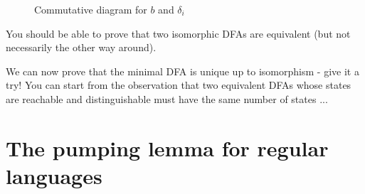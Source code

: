 \begin{figure}[h]
\caption{Commutative diagram for $b$ and $\delta_i$\label{diagram1}}
\end{figure}


You should be able to prove that two isomorphic DFAs are equivalent
(but not necessarily the other way around).



We can now prove that the minimal DFA is unique up to isomorphism -
give it a try! You can start from the observation that two equivalent
DFAs whose states are reachable and distinguishable must have the same
number of states ...



\section{The pumping lemma for regular languages}

